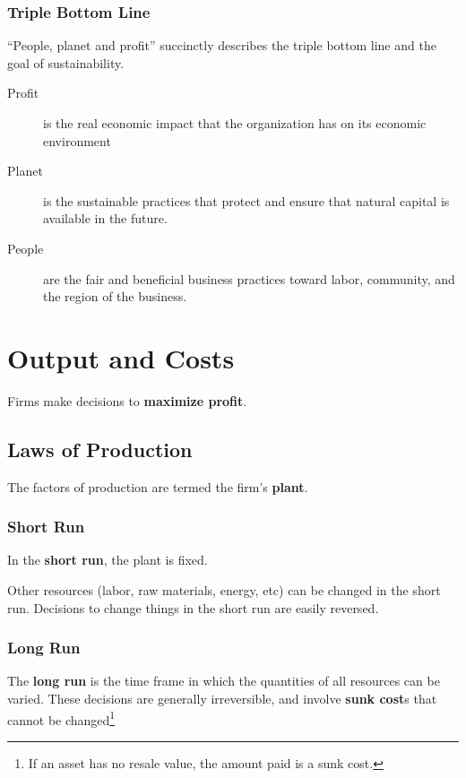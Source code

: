                 \subsection{Triple Bottom Line} %
                \label{sub:triple_bottom_line}
                    ``People, planet and profit'' succinctly describes the triple bottom line and the goal of sustainability.

                    \begin{description}
                        \item[Profit] is the real economic impact that the organization has on its economic environment
                        \item[Planet] is the sustainable practices that protect and ensure that natural capital is available in the future.
                        \item[People] are the fair and beneficial business practices toward labor, community, and the region of the business.
                    \end{description}

        \chapter{Output and Costs} %
        \label{cha:output_and_costs}
            Firms make decisions to \textbf{maximize profit}.
            \section{Laws of Production} %
            \label{sec:laws_of_production}
                The factors of production are termed the firm's \textbf{plant}.
                \subsection{Short Run} %
                \label{sub:short_run}
                    In the \textbf{short run}, the plant is fixed.

                    Other resources (labor, raw materials, energy, etc) can be changed in the short run.
                    Decisions to change things in the short run are easily reversed.
                \subsection{Long Run} %
                \label{sub:long_run}
                    The \textbf{long run} is the time frame in which the quantities of all resources can be varied.
                    These decisions are generally irreversible, and involve \textbf{sunk cost}s that cannot be changed\footnote{If an asset has no resale value, the amount paid is a sunk cost.}

